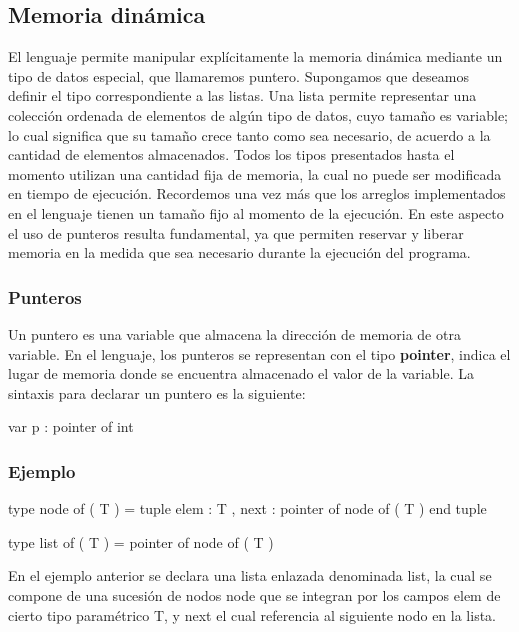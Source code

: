 \subsection{Memoria dinámica}
El lenguaje permite manipular explícitamente la memoria dinámica mediante un tipo de datos especial, que llamaremos puntero. Supongamos que deseamos definir el tipo correspondiente a las listas. Una lista permite representar una colección ordenada de elementos de algún tipo de datos, cuyo tamaño es variable; lo cual significa que su tamaño crece tanto como sea necesario, de acuerdo a la cantidad de elementos almacenados. Todos los tipos presentados hasta el momento utilizan una cantidad fija de memoria, la cual no puede ser modificada en tiempo de ejecución. Recordemos una vez más que los arreglos implementados en el lenguaje tienen un tamaño fijo al momento de la ejecución. En este aspecto el uso de punteros resulta fundamental, ya que permiten reservar y liberar memoria en la medida que sea necesario durante la ejecución del programa.

\subsubsection{Punteros}
Un puntero es una variable que almacena la dirección de memoria de otra variable. En el lenguaje, los punteros se representan con el tipo \textbf{pointer}, indica el lugar de memoria donde se encuentra almacenado el valor de la variable. La sintaxis para declarar un puntero es la siguiente:

\begin{pascallike}
var p : pointer of int
\end{pascallike}

\subsubsection{Ejemplo}

\begin{pascallike}
type node of ( T ) = tuple
                     elem : T ,
                     next : pointer of node of ( T )
                     end tuple

type list of ( T ) = pointer of node of ( T )
\end{pascallike}

En el ejemplo anterior se declara una lista enlazada denominada list, la cual se compone de una sucesión de nodos node que se integran por los campos elem de cierto tipo paramétrico T, y next el cual referencia al siguiente nodo en la lista.

